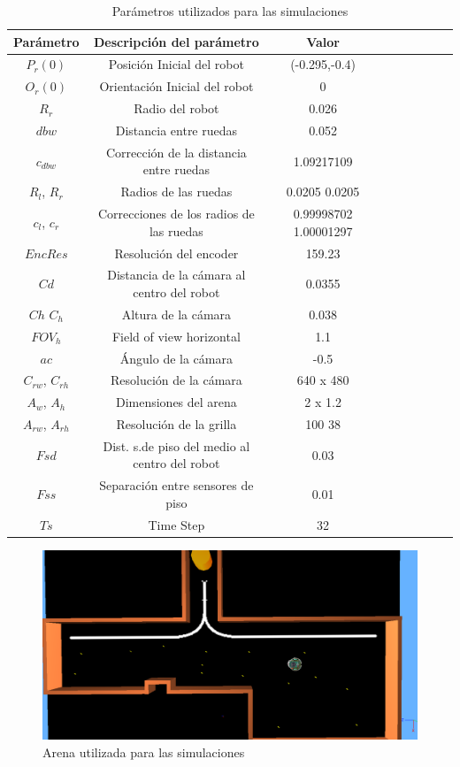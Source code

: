 \begin{table}[ht]
	\begin{center}
		\begin{tabular}{|c|c|c|c|c|c|c|c|c|}
			\hline
			Par\'ametro & Descripci\'on del par\'ametro & Valor \\
			\hline
			$P_r(0)$ & Posici\'on Inicial del robot & (-0.295,-0.4) \\
			$O_r(0)$ & Orientaci\'on Inicial del robot & 0 \\
			$R_r$ & Radio del robot & 0.026 \\
			$dbw$ & Distancia entre ruedas & 0.052 \\
			$c_{dbw}$ & Correcci\'on de la distancia entre ruedas & 1.09217109 \\
			$R_l$, $R_r$ & Radios de las ruedas & 0.0205 0.0205 \\
			$c_l$, $c_r$ & Correcciones de los radios de las ruedas & 0.99998702 
			1.00001297 \\
			$EncRes$ & Resoluci\'on del encoder & 159.23 \\
			$Cd$ & Distancia de la c\'amara al centro del robot & 0.0355 \\
			$Ch$ $C_h$ & Altura de la c\'amara & 0.038 \\
			$FOV_h$ & Field of view horizontal & 1.1 \\
			$ac$ & \'Angulo de la c\'amara & -0.5 \\
			$C_{rw}$, $C_{rh}$ & Resoluci\'on de la c\'amara & 640 x 480 \\
			$A_w$, $A_h$ & Dimensiones del arena & 2 x 1.2 \\
			$A_{rw}$, $A_{rh}$ & Resoluci\'on de la grilla & 100 38\\
			$Fsd$ & Dist. s.de piso del medio al centro del robot & 0.03 \\
			$Fss$ & Separaci\'on entre sensores de piso & 0.01 \\
			$Ts$ & Time Step & 32 \\
			\hline
		\end{tabular}
	\end{center}
	\caption{Par\'ametros utilizados para las simulaciones}
	\label{sim_params}
\end{table}

\begin{figure}[htp]
\begin{center}
\includegraphics[scale=0.25]{comportamientos/arenaSim.png}
\caption{Arena utilizada para las simulaciones}
\label{fig:arena_sim}
\end{center}
\end{figure}

